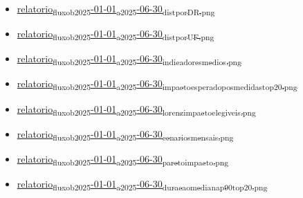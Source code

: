 \documentclass[11pt]{article}
\begin{document}
\begin{itemize}
\item \href{file:///home/gustavodetarso/Documentos/atestmed-defender/graphs\_and\_tables/exports/relatorio\_fluxo\_b\_2025-01-01\_a\_2025-06-30\_dist\_por\_DR.png}{relatorio\textsubscript{fluxo}\textsubscript{b}\textsubscript{2025}-01-01\textsubscript{a}\textsubscript{2025}-06-30\textsubscript{dist}\textsubscript{por}\textsubscript{DR.png}}
\item \href{file:///home/gustavodetarso/Documentos/atestmed-defender/graphs\_and\_tables/exports/relatorio\_fluxo\_b\_2025-01-01\_a\_2025-06-30\_dist\_por\_UF.png}{relatorio\textsubscript{fluxo}\textsubscript{b}\textsubscript{2025}-01-01\textsubscript{a}\textsubscript{2025}-06-30\textsubscript{dist}\textsubscript{por}\textsubscript{UF.png}}
\item \href{file:///home/gustavodetarso/Documentos/atestmed-defender/graphs\_and\_tables/exports/relatorio\_fluxo\_b\_2025-01-01\_a\_2025-06-30\_indicadores\_medios.png}{relatorio\textsubscript{fluxo}\textsubscript{b}\textsubscript{2025}-01-01\textsubscript{a}\textsubscript{2025}-06-30\textsubscript{indicadores}\textsubscript{medios.png}}
\item \href{file:///home/gustavodetarso/Documentos/atestmed-defender/graphs\_and\_tables/exports/relatorio\_fluxo\_b\_2025-01-01\_a\_2025-06-30\_impacto\_esperado\_pos\_medidas\_top20.png}{relatorio\textsubscript{fluxo}\textsubscript{b}\textsubscript{2025}-01-01\textsubscript{a}\textsubscript{2025}-06-30\textsubscript{impacto}\textsubscript{esperado}\textsubscript{pos}\textsubscript{medidas}\textsubscript{top20.png}}
\item \href{file:///home/gustavodetarso/Documentos/atestmed-defender/graphs\_and\_tables/exports/relatorio\_fluxo\_b\_2025-01-01\_a\_2025-06-30\_lorenz\_impacto\_elegiveis.png}{relatorio\textsubscript{fluxo}\textsubscript{b}\textsubscript{2025}-01-01\textsubscript{a}\textsubscript{2025}-06-30\textsubscript{lorenz}\textsubscript{impacto}\textsubscript{elegiveis.png}}
\item \href{file:///home/gustavodetarso/Documentos/atestmed-defender/graphs\_and\_tables/exports/relatorio\_fluxo\_b\_2025-01-01\_a\_2025-06-30\_cenarios\_mensais.png}{relatorio\textsubscript{fluxo}\textsubscript{b}\textsubscript{2025}-01-01\textsubscript{a}\textsubscript{2025}-06-30\textsubscript{cenarios}\textsubscript{mensais.png}}
\item \href{file:///home/gustavodetarso/Documentos/atestmed-defender/graphs\_and\_tables/exports/relatorio\_fluxo\_b\_2025-01-01\_a\_2025-06-30\_pareto\_impacto.png}{relatorio\textsubscript{fluxo}\textsubscript{b}\textsubscript{2025}-01-01\textsubscript{a}\textsubscript{2025}-06-30\textsubscript{pareto}\textsubscript{impacto.png}}
\item \href{file:///home/gustavodetarso/Documentos/atestmed-defender/graphs\_and\_tables/exports/relatorio\_fluxo\_b\_2025-01-01\_a\_2025-06-30\_duracao\_mediana\_p90\_top20.png}{relatorio\textsubscript{fluxo}\textsubscript{b}\textsubscript{2025}-01-01\textsubscript{a}\textsubscript{2025}-06-30\textsubscript{duracao}\textsubscript{mediana}\textsubscript{p90}\textsubscript{top20.png}}
\end{itemize}
\end{document}
